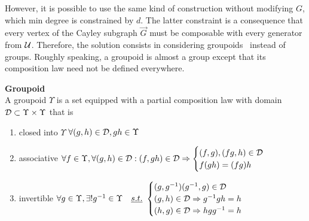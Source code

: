
However, it is possible to use the same kind of construction without modifying $G$, which min degree is constrained by $d$. The latter constraint is a consequence that every vertex of the Cayley subgraph $\vec{G}$ must be composable with every generator from $\mathcal{U}$. Therefore, the solution consists in considering groupoids~\citep{weinstein1996groupoids} instead of groups. Roughly speaking, a groupoid is almost a group except that its composition law need not be defined everywhere.

\begin{definition}\textbf{Groupoid}\\
A groupoid $\Upsilon$ is a set equipped with a partial composition law with domain $\mathcal{D} \subset \Upsilon \times \Upsilon$ that is
\begin{enumerate}
	\item closed into $\Upsilon$ \ie $\forall (g, h) \in \mathcal{D}, gh \in \Upsilon$
	\item associative \ie 
		$\forall f \in \Upsilon, \forall (g,h) \in \mathcal{D}: (f, gh) \in \mathcal{D} \Rightarrow
			\begin{cases}
				(f, g), (fg, h) \in \mathcal{D}\\
				f(gh) = (fg)h
			\end{cases}$
	\item invertible \ie
		$\forall g \in \Upsilon, \exists! g^{-1} \in \Upsilon \quad\emph{s.t.}~
			\begin{cases}
				(g,g^{-1}) (g^{-1},g)  \in \mathcal{D}\\
				(g,h) \in \mathcal{D} \Rightarrow g^{-1}gh = h\\
				(h,g) \in \mathcal{D} \Rightarrow hgg^{-1} = h
			\end{cases}$
\end{enumerate}
\end{definition}



